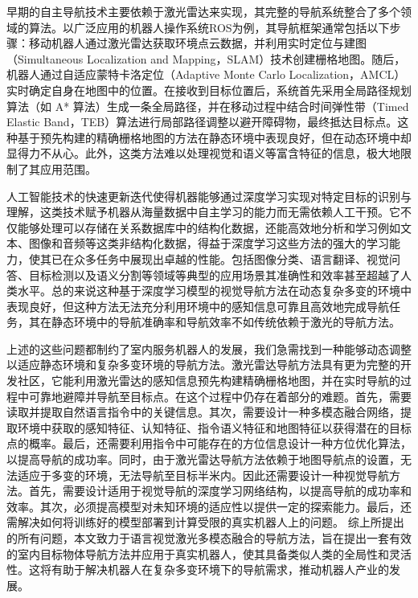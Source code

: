 	早期的自主导航技术主要依赖于激光雷达来实现，其完整的导航系统整合了多个领域的算法。以广泛应用的机器人操作系统ROS\cite{ROS2018}为例，其导航框架通常包括以下步骤：移动机器人通过激光雷达获取环境点云数据，并利用实时定位与建图（Simultaneous Localization and Mapping，SLAM）技术创建栅格地图。随后，机器人通过自适应蒙特卡洛定位（Adaptive Monte Carlo Localization，AMCL）\cite{dellaert1999monte, thrun2001robust} 实时确定自身在地图中的位置。在接收到目标位置后，系统首先采用全局路径规划算法（如 A* 算法\cite{hart1968formal}）生成一条全局路径，并在移动过程中结合时间弹性带（Timed Elastic Band，TEB）算法\cite{rosmann2013efficient}进行局部路径调整以避开障碍物，最终抵达目标点。这种基于预先构建的精确栅格地图的方法在静态环境中表现良好，但在动态环境中却显得力不从心。此外，这类方法难以处理视觉和语义等富含特征的信息，极大地限制了其应用范围。

	人工智能技术的快速更新迭代使得机器能够通过深度学习实现对特定目标的识别与理解，这类技术赋予机器从海量数据中自主学习的能力而无需依赖人工干预。它不仅能够处理可以存储在关系数据库中的结构化数据，还能高效地分析和学习例如文本、图像和音频等这类非结构化数据，得益于深度学习这些方法的强大的学习能力，使其已在众多任务中展现出卓越的性能。包括图像分类、语言翻译、视觉问答、目标检测以及语义分割等领域等典型的应用场景其准确性和效率甚至超越了人类水平。总的来说这种基于深度学习模型的视觉导航方法在动态复杂多变的环境中表现良好，但这种方法无法充分利用环境中的感知信息可靠且高效地完成导航任务，其在静态环境中的导航准确率和导航效率不如传统依赖于激光的导航方法。

	上述的这些问题都制约了室内服务机器人的发展，我们急需找到一种能够动态调整以适应静态环境和复杂多变环境的导航方法。激光雷达导航方法具有更为完整的开发社区，它能利用激光雷达的感知信息预先构建精确栅格地图，并在实时导航的过程中可靠地避障并导航至目标点。在这个过程中仍存在着部分的难题。首先，需要读取并提取自然语言指令中的关键信息。其次，需要设计一种多模态融合网络，提取环境中获取的感知特征、认知特征、指令语义特征和地图特征以获得潜在的目标点的概率。最后，还需要利用指令中可能存在的方位信息设计一种方位优化算法，以提高导航的成功率。同时，由于激光雷达导航方法依赖于地图导航点的设置，无法适应于多变的环境，无法导航至目标半米内。因此还需要设计一种视觉导航方法。首先，需要设计适用于视觉导航的深度学习网络结构，以提高导航的成功率和效率。其次，必须提高模型对未知环境的适应性以提供一定的探索能力。最后，还需解决如何将训练好的模型部署到计算受限的真实机器人上的问题。
	综上所提出的所有问题，本文致力于语言视觉激光多模态融合的导航方法，旨在提出一套有效的室内目标物体导航方法并应用于真实机器人，使其具备类似人类的全局性和灵活性。这将有助于解决机器人在复杂多变环境下的导航需求，推动机器人产业的发展。

